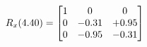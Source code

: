 \documentclass[preview]{standalone}
\begin{document}
\begin{align*}
\special{dvisvgm:raw <g id='unique000'>}R_{x}(4.40) = \begin{bmatrix}1 & 0 & 0 \\0 & -0.31 & +0.95 \\0 & -0.95 & -0.31\end{bmatrix}\special{dvisvgm:raw </g>}
\end{align*}
\end{document}
